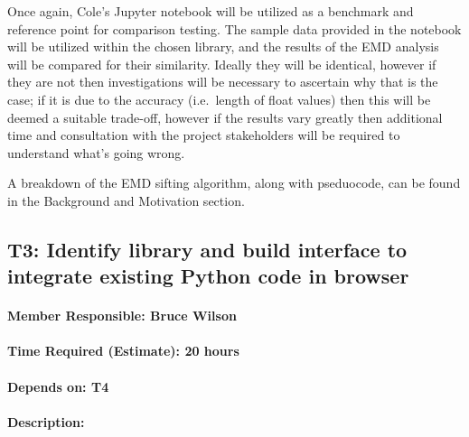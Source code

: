 \documentclass[
  english,
  paper=a4,
  oneside  ,captions=tableheading
]{scrbook}
\begin{document}
Once again, Cole's Jupyter notebook will be utilized as a benchmark and
reference point for comparison testing. The sample data provided in the
notebook will be utilized within the chosen library, and the results of
the EMD analysis will be compared for their similarity. Ideally they
will be identical, however if they are not then investigations will be
necessary to ascertain why that is the case; if it is due to the
accuracy (i.e.~length of float values) then this will be deemed a
suitable trade-off, however if the results vary greatly then additional
time and consultation with the project stakeholders will be required to
understand what's going wrong.

A breakdown of the EMD sifting algorithm, along with pseduocode, can be
found in the Background and Motivation section.

\newpage
\hypertarget{t3-identify-library-and-build-interface-to-integrate-existing-python-code-in-browser}{%
\subsection{T3: Identify library and build interface to integrate
existing Python code in
browser}\label{t3-identify-library-and-build-interface-to-integrate-existing-python-code-in-browser}}

\hypertarget{member-responsible-bruce-wilson}{%
\paragraph{Member Responsible: Bruce
Wilson}\label{member-responsible-bruce-wilson}}

\hypertarget{time-required-estimate-20-hours}{%
\paragraph{Time Required (Estimate): 20
hours}\label{time-required-estimate-20-hours}}

\hypertarget{depends-on-t4}{%
\paragraph{Depends on: T4}\label{depends-on-t4}}

\hypertarget{description-1}{%
\paragraph{Description:}\label{description-1}}
\end{document}
